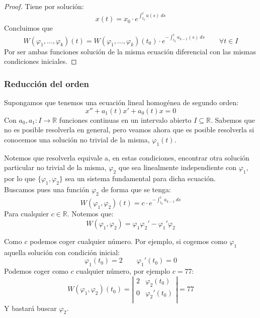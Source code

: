 \begin{proof}
    Tiene por solución:
    \begin{equation*}
        x(t) = x_0\cdot  e^{\displaystyle \int_{t_0}^{t} a(s)~ds }
    \end{equation*}
    Concluimos que
    \begin{equation*}
        W(\varphi_1,\ldots,\varphi_k)(t) = W(\varphi_1,\ldots,\varphi_k)(t_0) \cdot e^{\displaystyle - \int_{t_0}^{t} a_{k-1}(s)~ds } \qquad \forall t\in I
    \end{equation*}
    Por ser ambas funciones solución de la misma ecuación diferencial con las mismas condiciones iniciales.
\end{proof}

\subsubsection{Reducción del orden}
\noindent
Supongamos que tenemos una ecuación lineal homogénea de segundo orden:
\begin{equation*}
    x'' + a_1(t) x' + a_0(t) x = 0
\end{equation*}
Con $a_0,a_1:I\rightarrow\mathbb{R}$ funciones continuas en un intervalo abierto $I\subseteq \mathbb{R}$.
Sabemos que no es posible resolverla en general, pero veamos ahora que es posible resolverla si conocemos una solución no trivial de la misma, $\varphi_1(t)$.

Notemos que resolverla equivale a, en estas condiciones, encontrar otra solución particular no trivial de la misma, $\varphi_2$ que sea linealmente independiente con $\varphi_1$, por lo que $\{\varphi_1,\varphi_2\}$ sea un sistema fundamental para dicha ecuación.\\

Buscamos pues una función $\varphi_2$ de forma que se tenga:
\begin{equation*}
    W(\varphi_1,\varphi_2)(t) = c \cdot  e^{\displaystyle -\int_{t_0}^{t} a_{k-1}~ds }
\end{equation*}
Para cualquier $c\in \mathbb{R}$. Notemos que:
\begin{equation*}
    W(\varphi_1,\varphi_2) = \varphi_1\varphi_2' - \varphi_1' \varphi_2
\end{equation*}

\begin{ejemplo}
    Como $c$ podemos coger cualquier número. Por ejemplo, si cogemos como $\varphi_1$ aquella solución con condición inicial:
    \begin{equation*}
        \varphi_1(t_0) = 2 \qquad \varphi_1'(t_0) = 0
    \end{equation*}
    Podemos coger como $c$ cualquier número, por ejemplo $c=77$:
    \begin{equation*}
        W(\varphi_1,\varphi_2)(t_0) = \left|\begin{array}{cc}
            2 & \varphi_2(t_0)  \\
            0 & \varphi_2'(t_0) \\
        \end{array}\right| = 77
    \end{equation*}
    Y bastará buscar $\varphi_2$.
\end{ejemplo}

